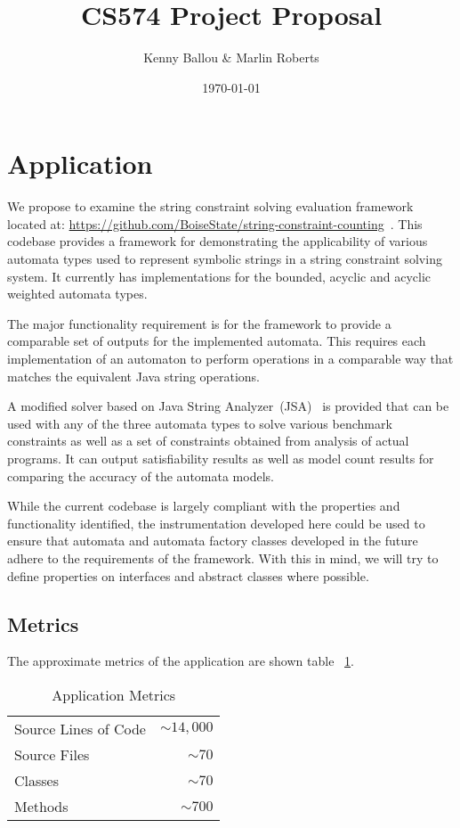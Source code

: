 \documentclass[letterpaper,11pt,twocolumn]{article}
\title{CS574 Project Proposal}
\date{\today}
\author{Kenny Ballou \& Marlin Roberts}
\begin{document}
\maketitle{}
\tableofcontents{}

\section{Application}

We propose to examine the string constraint solving evaluation framework
located at:
\url{https://github.com/BoiseState/string-constraint-counting}~\cite{Sherman_2019}.
This codebase provides a framework for demonstrating the applicability of
various automata types used to represent symbolic strings in a string
constraint solving system.  It currently has implementations for the bounded,
acyclic and acyclic weighted automata types.

The major functionality requirement is for the framework to provide a
comparable set of outputs for the implemented automata.  This requires each
implementation of an automaton to perform operations in a comparable way that
matches the equivalent Java string operations.

A modified solver based on Java String Analyzer~(JSA)~\cite{strings2003} is
provided that can be used with any of the three automata types to solve various
benchmark constraints as well as a set of constraints obtained from analysis of
actual programs.  It can output satisfiability results as well as model count
results for comparing the accuracy of the automata models.

While the current codebase is largely compliant with the properties and
functionality identified, the instrumentation developed here could be used to
ensure that automata and automata factory classes developed in the future
adhere to the requirements of the framework.  With this in mind, we will try to
define properties on interfaces and abstract classes where possible.

\subsection{Metrics}

The approximate metrics of the application are shown table
~\ref{tab:app-metrics}.


\begin{table}[ht]\label{tab:app-metrics}
  \centering
  \begin{tabular}{lr}
    \toprule
    Source Lines of Code & \(\sim14,000\) \\
    Source Files         & \(\sim70\) \\
    Classes              & \(\sim70\) \\
    Methods              & \(\sim700\) \\
    \bottomrule
  \end{tabular}
  \caption{Application Metrics}
\end{table}
\end{document}
